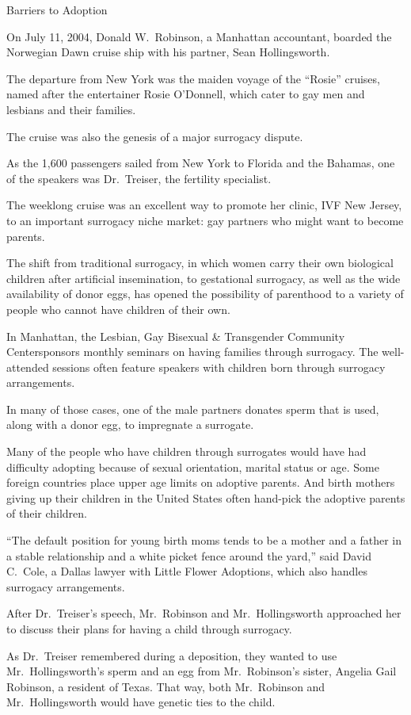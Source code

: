 ﻿\documentclass[12pt]{article}
\begin{document}
Barriers to Adoption

On July 11, 2004, Donald W.~Robinson, a Manhattan accountant, boarded the Norwegian Dawn cruise ship
with his partner, Sean Hollingsworth.

The departure from New York was the maiden voyage of the ``Rosie'' cruises, named after the
entertainer Rosie O'Donnell, which cater to gay men and lesbians and their families.

The cruise was also the genesis of a major surrogacy dispute.

As the 1,600 passengers sailed from New York to Florida and the Bahamas, one of the speakers was
Dr.~Treiser, the fertility specialist.

The weeklong cruise was an excellent way to promote her clinic, IVF New Jersey, to an important
surrogacy niche market: gay partners who might want to become parents.

The shift from traditional surrogacy, in which women carry their own biological children after
artificial insemination, to gestational surrogacy, as well as the wide availability of donor eggs,
has opened the possibility of parenthood to a variety of people who cannot have children of their
own.

In Manhattan, the Lesbian, Gay Bisexual \& Transgender Community Centersponsors monthly seminars on
having families through surrogacy. The well-attended sessions often feature speakers with children
born through surrogacy arrangements.

In many of those cases, one of the male partners donates sperm that is used, along with a donor egg,
to impregnate a surrogate.

Many of the people who have children through surrogates would have had difficulty adopting because
of sexual orientation, marital status or age. Some foreign countries place upper age limits on
adoptive parents. And birth mothers giving up their children in the United States often hand-pick
the adoptive parents of their children.

``The default position for young birth moms tends to be a mother and a father in a stable
relationship and a white picket fence around the yard,'' said David C.~Cole, a Dallas lawyer with
Little Flower Adoptions, which also handles surrogacy arrangements.

After Dr.~Treiser's speech, Mr.~Robinson and Mr.~Hollingsworth approached her to discuss their plans
for having a child through surrogacy.

As Dr.~Treiser remembered during a deposition, they wanted to use Mr.~Hollingsworth's sperm and an
egg from Mr.~Robinson's sister, Angelia Gail Robinson, a resident of Texas. That way, both
Mr.~Robinson and Mr.~Hollingsworth would have genetic ties to the child.
\end{document}
